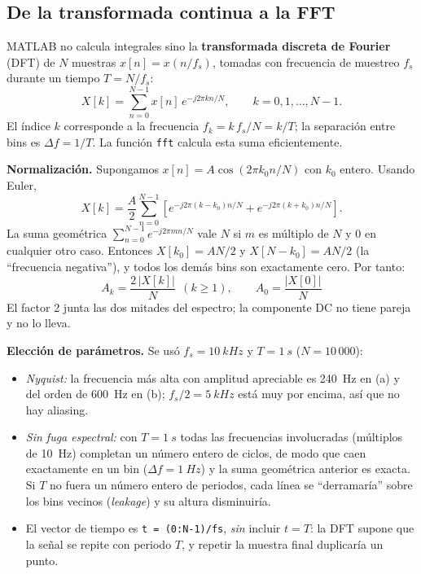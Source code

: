 \documentclass[11pt,letterpaper]{article}
\begin{document}
\subsection{De la transformada continua a la FFT}\label{sec:fft}

MATLAB no calcula integrales sino la \textbf{transformada discreta de Fourier} (DFT) de $N$ muestras
$x[n]=x(n/f_s)$, tomadas con frecuencia de muestreo $f_s$ durante un tiempo $T=N/f_s$:
\begin{equation}
  X[k]=\sum_{n=0}^{N-1}x[n]\,e^{-j2\pi kn/N},\qquad k=0,1,\dots,N-1 .
\end{equation}
El índice $k$ corresponde a la frecuencia $f_k=k\,f_s/N=k/T$; la separación entre bins es
$\Delta f=1/T$. La función \texttt{fft} calcula esta suma eficientemente.

\textbf{Normalización.} Supongamos $x[n]=A\cos(2\pi k_0 n/N)$ con $k_0$ entero. Usando Euler,
\begin{equation}
  X[k]=\frac{A}{2}\sum_{n=0}^{N-1}\left[e^{-j2\pi(k-k_0)n/N}+e^{-j2\pi(k+k_0)n/N}\right].
\end{equation}
La suma geométrica $\sum_{n=0}^{N-1}e^{-j2\pi m n/N}$ vale $N$ si $m$ es múltiplo de $N$ y $0$ en cualquier
otro caso. Entonces $X[k_0]=AN/2$ y $X[N-k_0]=AN/2$ (la ``frecuencia negativa''), y todos los demás bins
son exactamente cero. Por tanto:
\begin{equation}
  \boxed{\;A_k=\frac{2\,|X[k]|}{N}\ \ (k\ge1),\qquad A_0=\frac{|X[0]|}{N}\;}
\end{equation}
El factor 2 junta las dos mitades del espectro; la componente DC no tiene pareja y no lo lleva.

\textbf{Elección de parámetros.} Se usó $f_s=\SI{10}{kHz}$ y $T=\SI{1}{s}$ ($N=10\,000$):
\begin{itemize}
  \item \emph{Nyquist:} la frecuencia más alta con amplitud apreciable es \SI{240}{Hz} en (a) y del
  orden de \SI{600}{Hz} en (b); $f_s/2=\SI{5}{kHz}$ está muy por encima, así que no hay aliasing.
  \item \emph{Sin fuga espectral:} con $T=\SI{1}{s}$ todas las frecuencias involucradas (múltiplos de
  \SI{10}{Hz}) completan un número entero de ciclos, de modo que caen exactamente en un bin
  ($\Delta f=\SI{1}{Hz}$) y la suma geométrica anterior es exacta. Si $T$ no fuera un número entero de
  periodos, cada línea se ``derramaría'' sobre los bins vecinos (\emph{leakage}) y su altura disminuiría.
  \item El vector de tiempo es \texttt{t = (0:N-1)/fs}, \emph{sin} incluir $t=T$: la DFT supone que la señal
  se repite con periodo $T$, y repetir la muestra final duplicaría un punto.
\end{itemize}
\end{document}
